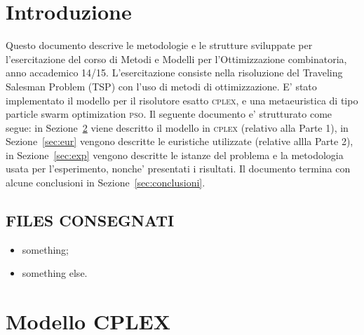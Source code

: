 \documentclass[
12pt, %
a4paper, %
oneside, %
headinclude,footinclude, %
BCOR5mm, %
]{scrartcl}
\begin{document}





\section{Introduzione}

Questo documento descrive le metodologie e le strutture sviluppate per l'esercitazione del corso di Metodi e Modelli per l'Ottimizzazione combinatoria, anno accademico 14/15. L'esercitazione consiste nella risoluzione del  Traveling Salesman Problem (TSP) con l'uso di metodi di ottimizzazione. E' stato implementato il modello per il risolutore esatto \textsc{cplex}, e una metaeuristica di tipo particle swarm optimization \textsc{pso}. Il seguente documento e' strutturato come segue: in Sezione~\ref{sec:cplex} viene descritto il modello in \textsc{cplex} (relativo alla Parte 1), in Sezione~\ref{sec:eur} vengono descritte le euristiche utilizzate (relative allla Parte 2), in Sezione~\ref{sec:exp} vengono descritte le istanze del problema e la metodologia usata per l'esperimento, nonche' presentati i risultati. Il documento termina con alcune conclusioni in Sezione~\ref{sec:conclusioni}.

\subsection{FILES CONSEGNATI}

\begin{itemize}
\item something;
\item something else.
\end{itemize}

\section{Modello CPLEX} \label{sec:cplex}
\end{document}
